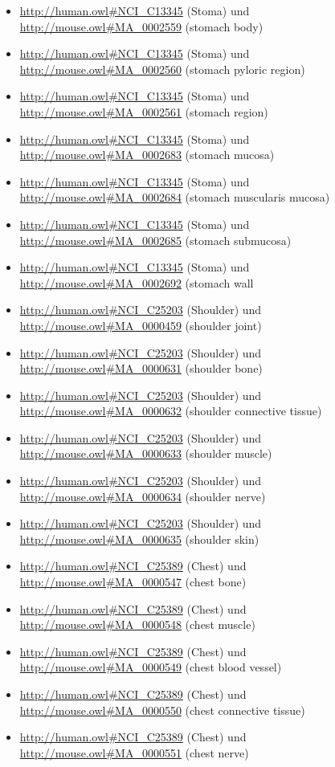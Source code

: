 \begin{itemize}
	\item \url{http://human.owl#NCI_C13345} (Stoma) und \url{http://mouse.owl#MA_0002559} (stomach body)
	\item \url{http://human.owl#NCI_C13345} (Stoma) und \url{http://mouse.owl#MA_0002560} (stomach pyloric region)
	\item \url{http://human.owl#NCI_C13345} (Stoma) und \url{http://mouse.owl#MA_0002561} (stomach region)
	\item \url{http://human.owl#NCI_C13345} (Stoma) und \url{http://mouse.owl#MA_0002683} (stomach mucosa)
	\item \url{http://human.owl#NCI_C13345} (Stoma) und \url{http://mouse.owl#MA_0002684} (stomach muscularis mucosa)
	\item \url{http://human.owl#NCI_C13345} (Stoma) und \url{http://mouse.owl#MA_0002685} (stomach submucosa)
	\item \url{http://human.owl#NCI_C13345} (Stoma) und \url{http://mouse.owl#MA_0002692} (stomach wall
	\item \url{http://human.owl#NCI_C25203} (Shoulder) und \url{http://mouse.owl#MA_0000459} (shoulder joint)
	\item \url{http://human.owl#NCI_C25203} (Shoulder) und \url{http://mouse.owl#MA_0000631} (shoulder bone)
	\item \url{http://human.owl#NCI_C25203} (Shoulder) und \url{http://mouse.owl#MA_0000632} (shoulder connective tissue)
	\item \url{http://human.owl#NCI_C25203} (Shoulder) und \url{http://mouse.owl#MA_0000633} (shoulder muscle)
	\item \url{http://human.owl#NCI_C25203} (Shoulder) und \url{http://mouse.owl#MA_0000634} (shoulder nerve)
	\item \url{http://human.owl#NCI_C25203} (Shoulder) und \url{http://mouse.owl#MA_0000635} (shoulder skin)
	\item \url{http://human.owl#NCI_C25389} (Chest) und \url{http://mouse.owl#MA_0000547} (chest bone)
	\item \url{http://human.owl#NCI_C25389} (Chest) und \url{http://mouse.owl#MA_0000548} (chest muscle)
	\item \url{http://human.owl#NCI_C25389} (Chest) und \url{http://mouse.owl#MA_0000549} (chest blood vessel)
	\item \url{http://human.owl#NCI_C25389} (Chest) und \url{http://mouse.owl#MA_0000550} (chest connective tissue)
	\item \url{http://human.owl#NCI_C25389} (Chest) und \url{http://mouse.owl#MA_0000551} (chest nerve)

\end{itemize}
